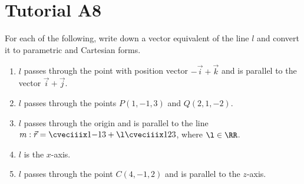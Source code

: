\section{Tutorial A8}

\begin{problem}
    For each of the following, write down a vector equivalent of the line $l$ and convert it to parametric and Cartesian forms.

    \begin{enumerate}
        \item $l$ passes through the point with position vector $-\vec i + \vec k$ and is parallel to the vector $\vec i + \vec j$.
        \item $l$ passes through the points $P(1, -1, 3)$ and $Q(2, 1, -2)$.
        \item $l$ passes through the origin and is parallel to the line $m: \vec r = \cveciiix1{-1}3 + \l \cveciiix123$, where $\l \in \RR$.
        \item $l$ is the $x$-axis.
        \item $l$ passes through the point $C(4,-1, 2)$ and is parallel to the $z$-axis.
    \end{enumerate}
\end{problem}
